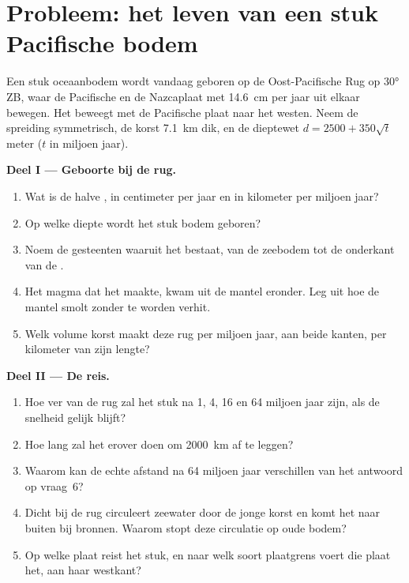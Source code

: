 \section{Probleem: het leven van een stuk Pacifische bodem}

\begin{problem}
\label{pb:g11:ocean-ridges:1}
Een stuk oceaanbodem wordt vandaag geboren op de Oost-Pacifische Rug op \ang{30}
ZB, waar de Pacifische en de Nazcaplaat met \qty{14.6}{cm} per jaar uit elkaar bewegen.
Het beweegt met de Pacifische plaat naar het westen. Neem de spreiding symmetrisch, de
korst \qty{7.1}{km} dik, en de dieptewet $d = 2500 + 350\sqrt{t}$ meter
($t$ in miljoen jaar).

\medskip
\noindent\textbf{Deel I --- Geboorte bij de rug.}
\begin{enumerate}
  \item Wat is de halve , in centimeter per jaar en in
        kilometer per miljoen jaar?
  \item Op welke diepte wordt het stuk bodem geboren?
  \item Noem de gesteenten waaruit het bestaat, van de zeebodem tot de onderkant van
        de .
  \item Het magma dat het maakte, kwam uit de mantel eronder. Leg uit hoe de
        mantel smolt zonder te worden verhit.
  \item Welk volume korst maakt deze rug per miljoen jaar, aan
        beide kanten, per kilometer van zijn lengte?
\end{enumerate}

\medskip
\noindent\textbf{Deel II --- De reis.}
\begin{enumerate}[resume]
  \item Hoe ver van de rug zal het stuk na 1, 4, 16 en 64
        miljoen jaar zijn, als de snelheid gelijk blijft?
  \item Hoe lang zal het erover doen om \qty{2000}{km} af te leggen?
  \item Waarom kan de echte afstand na 64 miljoen jaar verschillen van het
        antwoord op vraag~6?
  \item Dicht bij de rug circuleert zeewater door de jonge korst en
        komt het naar buiten bij bronnen. Waarom stopt deze circulatie op oude bodem?
  \item Op welke plaat reist het stuk, en naar welk soort
        plaatgrens voert die plaat het, aan haar westkant?
\end{enumerate}


\end{problem}
